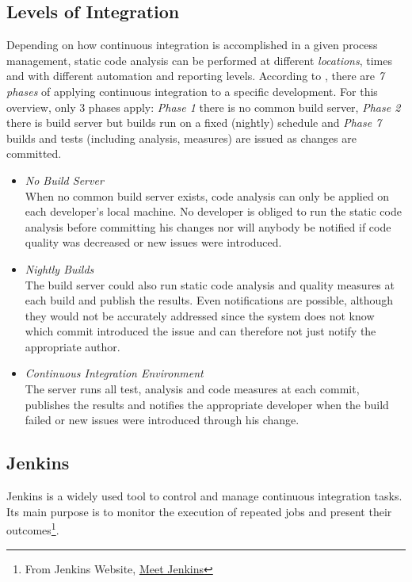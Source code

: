 \documentclass[conference]{IEEEtran}
\begin{document}
\subsection{Levels of Integration}
\label{subsec:ci_levels_of_integration}
Depending on how continuous integration is accomplished in a given process management, static code analysis can be performed at different \textit{locations}, times and with different automation and reporting levels. According to \cite[p. 6ff]{Jenkins:Smart:2011}, there are \textit{7 phases} of applying continuous integration to a specific development. For this overview, only 3 phases apply: \textit{Phase 1} there is no common build server, \textit{Phase 2} there is build server but builds run on a fixed (nightly) schedule and \textit{Phase 7} builds and tests (including analysis, measures) are issued as changes are committed.

\begin{itemize}
	\item[1] \textit{No Build Server} \\
	When no common build server exists, code analysis can only be applied on each developer's local machine. No developer is obliged to run the static code analysis before committing his changes nor will anybody be notified if code quality was decreased or new issues were introduced.
	
	
	\item[2] \textit{Nightly Builds} \\
	The build server could also run static code analysis and quality measures at each build and publish the results. Even notifications are possible, although they would not be accurately addressed since the system does not know which commit introduced the issue and can therefore not just notify the appropriate author.
	
	\item[3] \textit{Continuous Integration Environment} \\
	The server runs all test, analysis and code measures at each commit, publishes the results and notifies the appropriate developer when the build failed or new issues were introduced through his change.
\end{itemize}



\subsection{Jenkins}
\label{subsec:jenkins}
Jenkins is a widely used tool to control and manage continuous integration tasks. Its main purpose is to monitor the execution of repeated jobs and present their outcomes\footnote{From Jenkins Website, \href{https://wiki.jenkins-ci.org/display/JENKINS/Meet+Jenkins}{Meet Jenkins}}.
\end{document}
